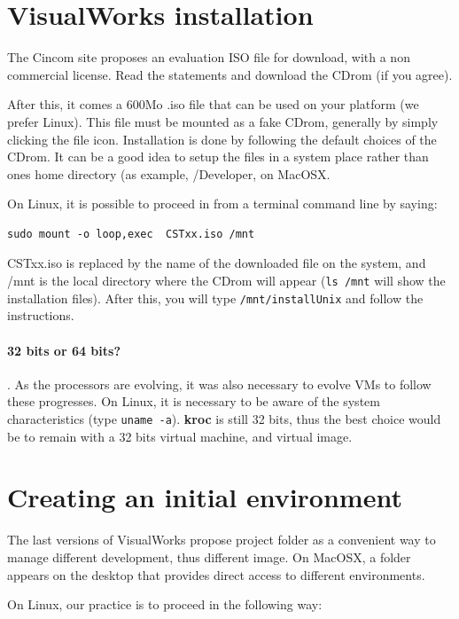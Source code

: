 \documentclass[times,a4paper]{book}
\begin{document}
\section{VisualWorks installation}

The Cincom site proposes an evaluation ISO file for download, with a non commercial
license. Read the statements and download the CDrom (if you agree).

After this, it comes a 600Mo .iso file that can be used on your platform (we prefer Linux).
This file must be mounted as a fake CDrom, generally by simply clicking the file icon.
Installation is done by following the default choices of the CDrom. It can be 
a good idea to setup the files in a system place rather than ones home directory
(as example, /Developer, on MacOSX.

On Linux, it is possible to proceed in from a terminal command  line by saying:

\begin{verbatim}  
sudo mount -o loop,exec  CSTxx.iso /mnt
\end{verbatim}

CSTxx.iso is replaced by the name of the downloaded file on the system, and /mnt is the local
directory where the CDrom will appear ({\tt ls /mnt} will show the installation files). After
this, you will type {\tt /mnt/installUnix} and follow the instructions.

\paragraph{32 bits or 64 bits?}. As the processors are evolving, it was also necessary
to evolve VMs to follow these progresses. On Linux, it is necessary to be aware
of the system characteristics (type {\tt uname -a}). {\bf kroc} is still 32 bits, thus
the best choice would be to remain with a 32 bits virtual machine, and virtual image.


\section {Creating an initial environment }
\label{sec:initialEnv}
The last versions of VisualWorks propose project folder as a convenient way 
to manage different development, thus different image. On MacOSX,
a folder appears on the desktop that provides direct access to different environments.

On Linux, our practice is to proceed in the following way:
\end{document}
